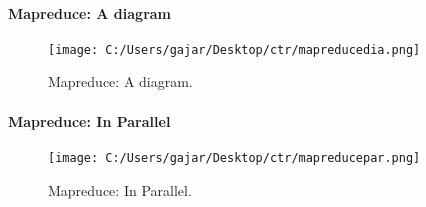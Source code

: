 \documentclass[
]{article}
\begin{document}
\hypertarget{mapreduce-a-diagram}{%
\paragraph{Mapreduce: A diagram}\label{mapreduce-a-diagram}}

\begin{figure}
\centering
\texttt{[image: C:/Users/gajar/Desktop/ctr/mapreducedia.png]}
\caption{Mapreduce: A diagram.}
\end{figure}

\hypertarget{mapreduce-in-parallel}{%
\paragraph{Mapreduce: In Parallel}\label{mapreduce-in-parallel}}

\begin{figure}
\centering
\texttt{[image: C:/Users/gajar/Desktop/ctr/mapreducepar.png]}
\caption{Mapreduce: In Parallel.}
\end{figure}
\end{document}
